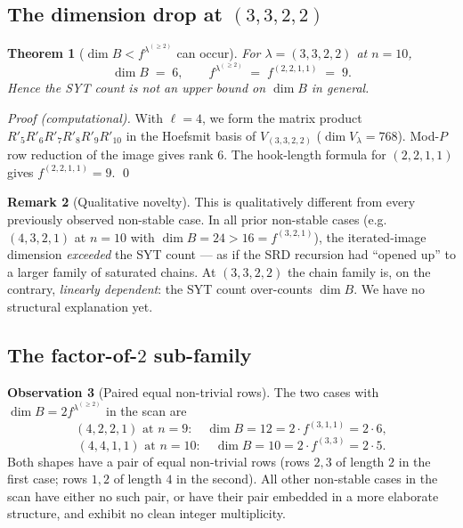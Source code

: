 \documentclass[11pt]{article}
\newtheorem{theorem}{Theorem}
\theoremstyle{definition}
\newtheorem{remark}[theorem]{Remark}
\newtheorem{observation}[theorem]{Observation}
\begin{document}
\subsection{The dimension drop at $(3,3,2,2)$}\label{ssec:drop}

\begin{theorem}[$\dim B < f^{\lambda^{(\ge 2)}}$ can occur]\label{thm:drop}
For $\lambda = (3,3,2,2)$ at $n = 10$,
\[
   \dim B \;=\; 6, \qquad f^{\lambda^{(\ge 2)}} \;=\; f^{(2,2,1,1)} \;=\; 9.
\]
Hence the SYT count is \emph{not} an upper bound on $\dim B$ in
general.
\end{theorem}

\begin{proof}[Proof (computational)]
With $\ell = 4$, we form the matrix product
$R'_5 R'_6 R'_7 R'_8 R'_9 R'_{10}$ in the Hoefsmit basis of $V_{(3,3,2,2)}$
($\dim V_\lambda = 768$). Mod-$P$ row reduction of the image gives rank $6$.
The hook-length formula for $(2,2,1,1)$ gives $f^{(2,2,1,1)} = 9$. \qed
\end{proof}

\begin{remark}[Qualitative novelty]
This is qualitatively different from every previously observed
non-stable case. In all prior non-stable cases (e.g.\ $(4,3,2,1)$ at
$n = 10$ with $\dim B = 24 > 16 = f^{(3,2,1)}$), the iterated-image
dimension \emph{exceeded} the SYT count --- as if the SRD recursion had
``opened up'' to a larger family of saturated chains. At $(3,3,2,2)$ the
chain family is, on the contrary, \emph{linearly dependent}: the
SYT count over-counts $\dim B$. We have no structural explanation yet.
\end{remark}

\subsection{The factor-of-$2$ sub-family}\label{ssec:factor2}

\begin{observation}[Paired equal non-trivial rows]\label{obs:pair}
The two cases with $\dim B = 2 f^{\lambda^{(\ge 2)}}$ in the scan are
\[
   (4,2,2,1) \text{ at } n = 9: \quad \dim B = 12 = 2 \cdot f^{(3,1,1)} = 2 \cdot 6,
\]
\[
   (4,4,1,1) \text{ at } n = 10: \quad \dim B = 10 = 2 \cdot f^{(3,3)} = 2 \cdot 5.
\]
Both shapes have a pair of equal non-trivial rows (rows $2,3$ of length
$2$ in the first case; rows $1,2$ of length $4$ in the second). All
other non-stable cases in the scan have either no such pair, or have
their pair embedded in a more elaborate structure, and exhibit no
clean integer multiplicity.
\end{observation}
\end{document}
